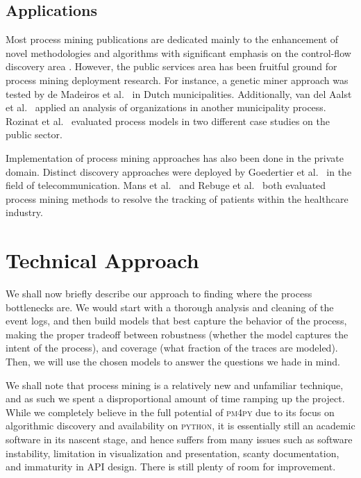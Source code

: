 \documentclass[conference]{IEEEtran}
\begin{document}
\subsection{Applications}

Most process mining publications are dedicated mainly to the enhancement
of novel methodologies and algorithms with significant emphasis on the
control-flow discovery area \cite{van2004}. However, the public services area
has been fruitful ground
for process mining deployment research. For instance, a
genetic miner approach was tested by de Madeiros et al.~\cite{deMe2007}
in Dutch municipalities. Additionally, van del Aalst et al.~\cite{RoDJ2009}
applied an analysis of organizations in another municipality process.
Rozinat et al.~\cite{RoMa2009} evaluated process models in two different case
studies on the public sector.

Implementation of process mining approaches has also been done in
the private domain. Distinct discovery approaches were
deployed by Goedertier et al.~\cite{GoDW2011} in the field of
telecommunication. Mans
et al.~\cite{MaSc2008} and Rebuge et al.~\cite{ReBu2012} both
evaluated process mining methods
to resolve the tracking of patients within the healthcare industry.

\section{Technical Approach}
\label{section-technical}

We shall now briefly describe our approach to finding
where the process bottlenecks are. We would start with a thorough analysis and
cleaning of the event logs, and then
build models that best capture the behavior of the
process, making the proper tradeoff
between robustness (whether the model captures the intent of the process),
and coverage (what fraction of the traces are modeled).
 Then, we will use the
chosen models to answer the questions we hade in mind.

We shall note that process mining is a relatively new and unfamiliar
technique, and
as such we spent a disproportional amount of time ramping up the project.
While we completely believe in the full potential of \textsc{pm4py} due to
its focus on algorithmic discovery and availability
on \textsc{python}, it is
essentially still an academic software in its nascent stage, and 
hence suffers from many issues such as software instability,
limitation in visualization and presentation, scanty documentation,
and immaturity in API design.  There is still plenty of room for
improvement.
\end{document}
